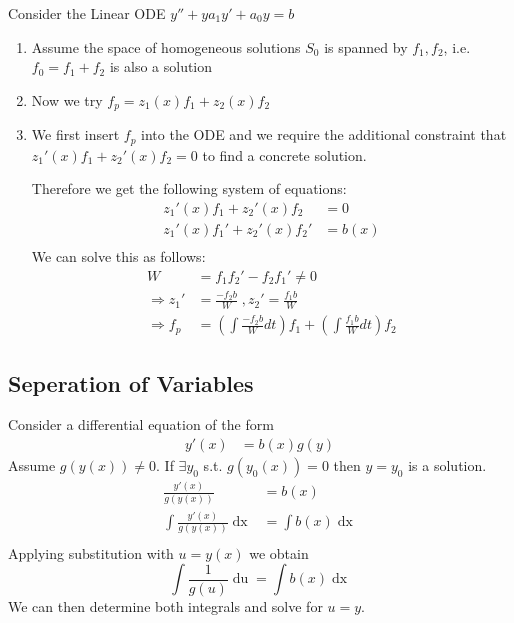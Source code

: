 \documentclass[a4paper,fontsize = 10pt]{article}
\begin{document}
Consider the Linear ODE $y'' + y a_1y' + a_0y = b$
\begin{enumerate}[label=(\arabic*)]
  \item Assume the space of homogeneous solutions $S_0$ is spanned by $f_1, f_2$, i.e. $f_0 = f_1 + f_2$ is also a solution  
  \item Now we try \(f_p = z_1(x) f_1 + z_2(x) f_2\)
  \item We first insert $f_p$ into the ODE and we require the additional constraint that $ z_1'(x) f_1 + z_2'(x) f_2 = 0$ to find a concrete solution. 
  
  Therefore we get the following system of equations:
  \begin{align*}
    z_1'(x) f_1 + z_2'(x) f_2 &= 0\\
    z_1'(x) f_1' + z_2'(x) f_2' &= b(x)\\
  \end{align*}
  We can solve this as follows:
  \begin{align*}
    W &= f_1 f_2' - f_2 f_1' \neq 0\\
    \Rightarrow z_1' &= \frac{-f_2 b}{W} \; , z_2' = \frac{f_1 b}{W}\\
    \Rightarrow f_p &= \left(\int \frac{-f_2 b}{W} dt\right)f_1  + \left(\int \frac{f_1 b}{W} dt\right)f_2 
  \end{align*}
\end{enumerate}

\subsection{Seperation of Variables}
    Consider a differential equation of the form 
    \begin{align*}
        y'(x) &= b(x)g(y)
    \end{align*}
    Assume $g(y(x)) \neq 0$. If $\exists y_0$ s.t. $g(y_0(x)) = 0$ then $y = y_0$ is a solution.
    \begin{align*}
        \frac{y'(x)}{g(y(x))} &= b(x)\\
        \int \frac{y'(x)}{g(y(x))} \mathop{dx} &= \int b(x) \mathop{dx}\\
    \end{align*}
    Applying substitution with $u = y(x)$ we obtain 
    $$\int \frac{1}{g(u)}\mathop{du} = \int b(x) \mathop{dx}$$
    We can then determine both integrals and solve for $u = y$.
\end{document}
